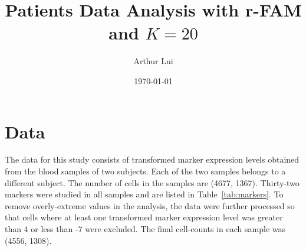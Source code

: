 \documentclass[11pt]{article} %
\title{Patients Data Analysis with r-FAM and $K=20$}
\author{Arthur Lui}
\date{\today} %
\begin{document}
\maketitle



\section{Data}\label{sec:data}
The data for this study consists of transformed marker expression levels
obtained from the blood samples of two subjects. Each of the two samples
belongs to a different subject. The number of cells in the samples are (4677,
1367). Thirty-two markers were studied in all samples and are listed
in Table~\ref{tab:markers}. To remove overly-extreme values in the analysis,
the data were further processed so that cells where at least one transformed
marker expression level was greater than 4 or less than -7 were excluded. The
final cell-counts in each sample was (4556, 1308).

\end{document}

